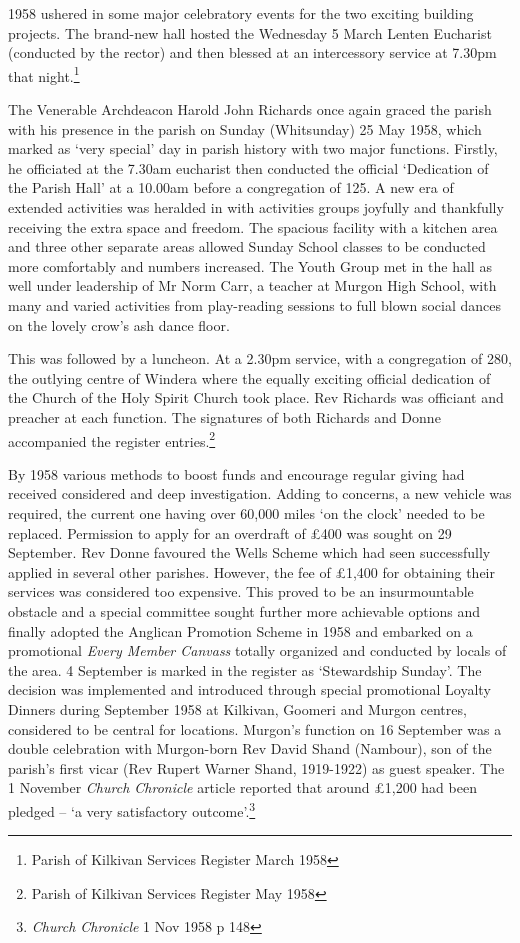1958 ushered in some major celebratory events for the two exciting
building projects. The brand-new hall hosted the Wednesday 5 March
Lenten Eucharist (conducted by the rector) and then blessed at an
intercessory service at 7.30pm that night.\footnote{Parish of Kilkivan
  Services Register March 1958}

The Venerable Archdeacon Harold John Richards once again graced the
parish with his presence in the parish on Sunday (Whitsunday) 25 May
1958, which marked as `very special' day in parish history with two
major functions. Firstly, he officiated at the 7.30am eucharist then
conducted the official `Dedication of the Parish Hall' at a 10.00am
before a congregation of 125. A new era of extended activities was
heralded in with activities groups joyfully and thankfully receiving the
extra space and freedom. The spacious facility with a kitchen area and
three other separate areas allowed Sunday School classes to be conducted
more comfortably and numbers increased. The Youth Group met in the hall
as well under leadership of Mr Norm Carr, a teacher at Murgon High
School, with many and varied activities from play-reading sessions to
full blown social dances on the lovely crow's ash dance floor.

This was followed by a luncheon. At a 2.30pm service, with a
congregation of 280, the outlying centre of Windera where the equally
exciting official dedication of the Church of the Holy Spirit Church
took place. Rev Richards was officiant and preacher at each function.
The signatures of both Richards and Donne accompanied the register
entries.\footnote{Parish of Kilkivan Services Register May 1958}

By 1958 various methods to boost funds and encourage regular giving had
received considered and deep investigation. Adding to concerns, a new
vehicle was required, the current one having over 60,000 miles `on the
clock' needed to be replaced. Permission to apply for an overdraft of
£400 was sought on 29 September. Rev Donne favoured the Wells Scheme
which had seen successfully applied in several other parishes. However,
the fee of £1,400 for obtaining their services was considered too
expensive. This proved to be an insurmountable obstacle and a special
committee sought further more achievable options and finally adopted the
Anglican Promotion Scheme in 1958 and embarked on a promotional
\emph{Every Member Canvass} totally organized and conducted by locals of
the area. 4 September is marked in the register as `Stewardship Sunday'.
The decision was implemented and introduced through special promotional
Loyalty Dinners during September 1958 at Kilkivan, Goomeri and Murgon
centres, considered to be central for locations. Murgon's function on 16
September was a double celebration with Murgon-born Rev David Shand
(Nambour), son of the parish's first vicar (Rev Rupert Warner Shand,
1919-1922) as guest speaker. The 1 November \emph{Church Chronicle}
article reported that around £1,200 had been pledged -- `a very
satisfactory outcome'.\footnote{\emph{Church Chronicle} 1 Nov 1958 p 148}

